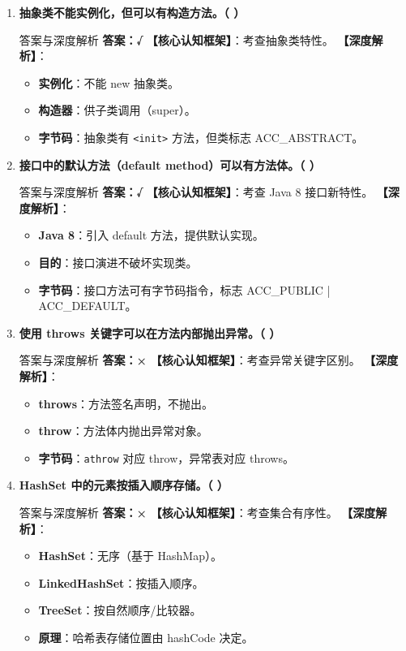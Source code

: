 \documentclass[12pt, a4paper]{ctexart}
\newcommand{\code}[1]{\texttt{\color{myblue}#1}}
\begin{document}
\begin{enumerate}[label=\arabic*.]
\item \textbf{抽象类不能实例化，但可以有构造方法。（ \quad ）}
\begin{bluebox}{答案与深度解析}
\textbf{答案：√}
\textbf{【核心认知框架】}：考查抽象类特性。
\textbf{【深度解析】}：
\begin{itemize}[leftmargin=*, nosep]
    \item \textbf{实例化}：不能 new 抽象类。
    \item \textbf{构造器}：供子类调用（super）。
    \item \textbf{字节码}：抽象类有 \code{<init>} 方法，但类标志 ACC\_ABSTRACT。
\end{itemize}
\end{bluebox}

\item \textbf{接口中的默认方法（default method）可以有方法体。（ \quad ）}
\begin{bluebox}{答案与深度解析}
\textbf{答案：√}
\textbf{【核心认知框架】}：考查 Java 8 接口新特性。
\textbf{【深度解析】}：
\begin{itemize}[leftmargin=*, nosep]
    \item \textbf{Java 8}：引入 default 方法，提供默认实现。
    \item \textbf{目的}：接口演进不破坏实现类。
    \item \textbf{字节码}：接口方法可有字节码指令，标志 ACC\_PUBLIC | ACC\_DEFAULT。
\end{itemize}
\end{bluebox}

\item \textbf{使用 throws 关键字可以在方法内部抛出异常。（ \quad ）}
\begin{bluebox}{答案与深度解析}
\textbf{答案：×}
\textbf{【核心认知框架】}：考查异常关键字区别。
\textbf{【深度解析】}：
\begin{itemize}[leftmargin=*, nosep]
    \item \textbf{throws}：方法签名声明，不抛出。
    \item \textbf{throw}：方法体内抛出异常对象。
    \item \textbf{字节码}：\code{athrow} 对应 throw，异常表对应 throws。
\end{itemize}
\end{bluebox}

\item \textbf{HashSet 中的元素按插入顺序存储。（ \quad ）}
\begin{bluebox}{答案与深度解析}
\textbf{答案：×}
\textbf{【核心认知框架】}：考查集合有序性。
\textbf{【深度解析】}：
\begin{itemize}[leftmargin=*, nosep]
    \item \textbf{HashSet}：无序（基于 HashMap）。
    \item \textbf{LinkedHashSet}：按插入顺序。
    \item \textbf{TreeSet}：按自然顺序/比较器。
    \item \textbf{原理}：哈希表存储位置由 hashCode 决定。
\end{itemize}
\end{bluebox}


\end{enumerate}
\end{document}
